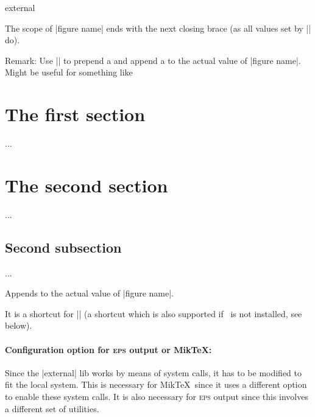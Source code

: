 {\begin{pgfplotslibrary}{external}
\begin{command}{}
\begin{codeexample}
\end{codeexample}
	The scope of |figure name| ends with the next closing brace (as all values set by |\tikzset| do).

	\medbreak
	Remark: Use || to prepend  a  and append a  to the actual value of |figure name|. Might be useful for something like
\begin{codeexample}
\tikzset{external/figure name=main}


\section{The first section}
{
	...
}

\section{The second section}
{
	...
	\subsection{Second subsection}
	{
		...
	}
}
\end{codeexample}
\end{command}

\begin{command}{\tikzappendtofigurename{}}
	Appends  to the actual value of |figure name|.

	It is a shortcut for || (a shortcut which is also supported if \tikzname\ is not installed, see below).
\end{command}


\paragraph{Configuration option for \textsc{eps} output or Mik\TeX:} Since the |external| lib works by means of system calls, it has to be modified to fit the local system. This is necessary for Mik\TeX\ since it uses a different option to enable these system calls. It is also necessary for \textsc{eps} output since this involves a different set of utilities.


\end{pgfplotslibrary}}
